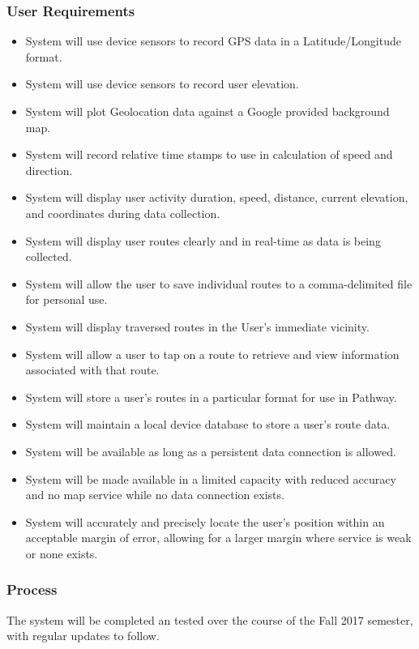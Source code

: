 \documentclass{article}
\begin{document}
\subsubsection{User Requirements}
\begin{itemize}
    \item System will use device sensors to record GPS data in a Latitude/Longitude format.
    \item System will use device sensors to record user elevation.
    \item System will plot Geolocation data against a Google provided background map.
    \item System will record relative time stamps to use in calculation of speed and direction.
    \item System will display user activity duration, speed, distance, current elevation, and coordinates during data collection.
    \item System will display user routes clearly and in real-time as data is being collected.
    \item System will allow the user to save individual routes to a comma-delimited file for personal use.
    \item System will display traversed routes in the User's immediate vicinity.
    \item System will allow a user to tap on a route to retrieve and view information associated with that route.
    \item System will store a user’s routes in a particular format for use in Pathway.
    \item System will maintain a local device database to store a user's route data.
    \item System will be available as long as a persistent data connection is allowed.
    \item System will be made available in a limited capacity with reduced accuracy and no map service while no data connection exists.
    \item System will accurately and precisely locate the user’s position within an acceptable margin of error, allowing for a larger margin where service is weak or none exists.
\end{itemize}

\subsubsection{Process}
The system will be completed an tested over the course of the Fall 2017 semester, with regular updates to follow.
\end{document}
